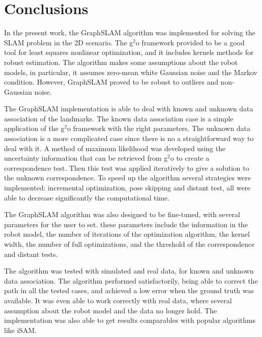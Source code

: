 \chapter{Conclusions}
\label{chap:conclusion}

In the present work, the GraphSLAM algorithm was implemented for solving the SLAM problem in the 2D scenario. The g$^2$o framework provided to be a good tool for least squares nonlinear optimization, and it includes kernels methods for robust estimation. The algorithm makes some assumptions about the robot models, in particular, it assumes zero-mean white Gaussian noise and the Markov condition. However, GraphSLAM proved to be robust to outliers and non-Gaussian noise.

The GraphSLAM implementation is able to deal with known and unknown data association of the landmarks. The known data association case is a simple application of the g$^2$o framework with the right parameters. The unknown data association is a more complicated case since there is no a straightforward way to deal with it. A method of maximum likelihood was developed using the uncertainty information that can be retrieved from g$^2$o to create a correspondence test. Then this test was applied iteratively to give a solution to the unknown correspondence. To speed up the algorithm several strategies were implemented: incremental optimization, pose skipping and distant test, all were able to decrease significantly the computational time.

The GraphSLAM algorithm was also designed to be fine-tuned, with several parameters for the user to set. these parameters include the information in the robot model, the number of iterations of the optimization algorithm, the kernel width, the number of full optimizations, and the threshold of the correspondence and distant tests. 

The algorithm was tested with simulated and real data, for known and unknown data association. The algorithm performed satisfactorily, being able to correct the path in all the tested cases, and achieved a low error when the ground truth was available. It was even able to work correctly with real data, where several assumption about the robot model and the data no longer hold. The implementation was also able to get results comparables with popular algorithms like iSAM.


